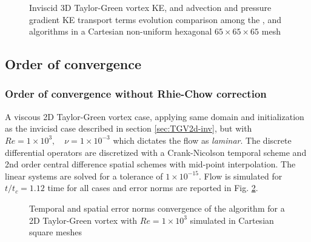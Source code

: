 \begin{figure}[!h]
\centering
{}
\caption{Inviscid 3D Taylor-Green vortex KE, and advection and pressure gradient KE transport terms evolution comparison among the \spaece, \spaeceA and \spaeceAdivFree algorithms in a Cartesian non-uniform hexagonal $65 \times 65 \times 65$ mesh} 
\label{fig:TGV3D-inv-A6}
\end{figure}







\clearpage
\newpage
\subsection{Order of convergence}
\label{sec:orderOfCon}
\subsubsection{Order of convergence without Rhie-Chow correction}
A viscous 2D Taylor-Green vortex case, applying same domain and initialization as the invicisd case described in section \ref{sec:TGV2d-inv}, but with $Re=1\times10^3,\quad \nu = 1\times10^{-3}$ which dictates the flow as \textit{laminar}. The discrete differential operators are discretized with a Crank-Nicolson temporal scheme and 2nd order central difference spatial schemes with mid-point interpolation. The linear systems are solved for a tolerance of $1\times10^{-15}$. Flow is simulated for $t/t_c = 1.12$ time for all cases and error norms are reported in Fig. \ref{fig:TGV2D-Cart1000-spaece}. 

\begin{figure}[!h]
\centering
{}
\caption{Temporal and spatial error norms convergence of the \spaece algorithm for a 2D Taylor-Green vortex with $Re=1\times10^3$ simulated in Cartesian square meshes} 
\label{fig:TGV2D-Cart1000-spaece}
\end{figure}

